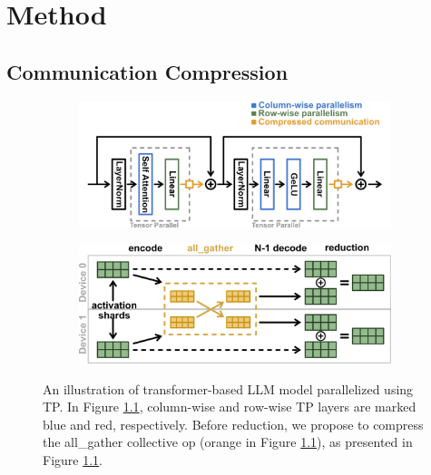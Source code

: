
\chapter{Method}
\section{Communication Compression}
\begin{figure}
\centering
    \begin{subfigure}{.70\textwidth}
        \centering
        \includegraphics[width=1\linewidth]{figures/overview_arch.png}
        \caption{}
        \label{fig:overview_arch}
    \end{subfigure} %

    \begin{subfigure}{.70\textwidth}
        \centering
 \includegraphics[width=1\linewidth]{figures/overview_comms.png}
        \caption{}
        \label{fig:overview_comms}
    \end{subfigure}
\caption{An illustration of transformer-based LLM model parallelized using TP. In Figure \ref{fig:overview_arch}, column-wise and row-wise TP layers are marked blue and red, respectively. Before reduction, we propose to compress the all\_gather collective op (orange in Figure \ref{fig:overview_arch}), as presented in Figure \ref{fig:overview_arch}.}
\label{fig:overview}
\end{figure}

